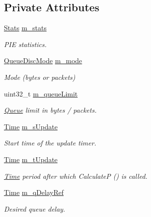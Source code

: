 \subsection*{Private Attributes}
\begin{DoxyCompactItemize}
\item 
\hyperlink{structns3_1_1PieQueueDisc_1_1Stats}{Stats} \hyperlink{classns3_1_1PieQueueDisc_a962196aaa98c57732483f1296347c61c}{m\+\_\+stats}
\begin{DoxyCompactList}\small\item\em P\+IE statistics. \end{DoxyCompactList}\item 
\hyperlink{classns3_1_1PieQueueDisc_af026730ff1c04dd9bdf74b1797ae2ac4}{Queue\+Disc\+Mode} \hyperlink{classns3_1_1PieQueueDisc_ad3e0fb992a133e8dcd1e0937a156ff2b}{m\+\_\+mode}
\begin{DoxyCompactList}\small\item\em Mode (bytes or packets) \end{DoxyCompactList}\item 
uint32\+\_\+t \hyperlink{classns3_1_1PieQueueDisc_ad5a24ff6288913559429261d124db5eb}{m\+\_\+queue\+Limit}
\begin{DoxyCompactList}\small\item\em \hyperlink{classns3_1_1Queue}{Queue} limit in bytes / packets. \end{DoxyCompactList}\item 
\hyperlink{classns3_1_1Time}{Time} \hyperlink{classns3_1_1PieQueueDisc_a25258274d61df8126b68fae4398a0918}{m\+\_\+s\+Update}
\begin{DoxyCompactList}\small\item\em Start time of the update timer. \end{DoxyCompactList}\item 
\hyperlink{classns3_1_1Time}{Time} \hyperlink{classns3_1_1PieQueueDisc_abf2ddf0a8be15f28fab235144118b06c}{m\+\_\+t\+Update}
\begin{DoxyCompactList}\small\item\em \hyperlink{classns3_1_1Time}{Time} period after which CalculateP () is called. \end{DoxyCompactList}\item 
\hyperlink{classns3_1_1Time}{Time} \hyperlink{classns3_1_1PieQueueDisc_aa5aef7970bc5164248e2bc2a4b024f60}{m\+\_\+q\+Delay\+Ref}
\begin{DoxyCompactList}\small\item\em Desired queue delay. \end{DoxyCompactList}\item 

\end{DoxyCompactItemize}
